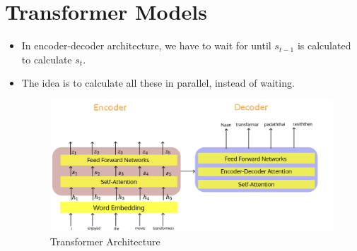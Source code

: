 \documentclass[a4paper]{article}
\begin{document}
\section{Transformer Models}
\begin{itemize}
    \item In encoder-decoder architecture, we have to wait for until $s_{t-1}$ is calculated to calculate $s_t$.
    \item The idea is to calculate all these in parallel, instead of waiting.
    \begin{figure}[H]
        \centering
        \includegraphics[width=0.8\linewidth]{Degree//static/DL_transformer_architecture.png}
        \caption{Transformer Architecture}
    \end{figure}
\end{itemize}
\end{document}
